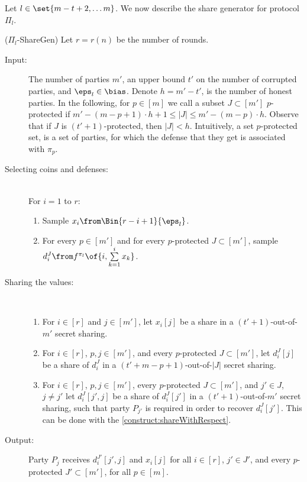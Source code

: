 Let $l\in\set{m-t+2,\ldots m}$. We now describe the share generator for protocol $\Pi_l$.
\begin{algorithm}($\Pi_l$-ShareGen)
Let $r=r(n)$ be the number of rounds.
\begin{description}
	\item[Input:] The number of parties $m'$, an upper bound $t'$ on the number of corrupted parties, and $\eps_l\in\bias$.
	Denote $h=m'-t'$, is the number of honest parties. In the following, for $p\in[m]$ we call a subset $J\subset[m']$ $p$-protected if $m'-(m-p+1)\cdot h+1\leq|J|\leq m'-(m-p)\cdot h$. Observe that if $J$ is $(t'+1)$-protected, then $|J|<h$. Intuitively, a set $p$-protected set, is a set of parties, for which the defense that they get is associated with $\pi_p$.
	\item[Selecting coins and defenses:]~\\
	For $i=1$ to $r$:
		\begin{enumerate}
			\item Sample $x_i\from\Bin{r-i+1}{\eps_l}$.
			\item For every $p\in[m']$ and for every $p$-protected $J\subset[m']$, sample $d^J_i\from f^{\pi_l}\of{i,\sum\limits_{k=1}^i x_k}$.
		\end{enumerate}
	\item[Sharing the values:]~
	\begin{enumerate}
		\item For $i\in[r]$ and $j\in[m']$, let $x_i[j]$ be a share in a $(t'+1)$-out-of-$m'$ secret sharing.
		\item For $i\in[r]$, $p,j\in[m']$, and every $p$-protected $J\subset[m']$, let $d_i^J[j]$ be a share of $d_i^J$ in a $(t'+m-p+1)$-out-of-$|J|$ secret sharing.
		\item For $i\in[r]$, $p,j\in[m']$, every $p$-protected $J\subset[m']$, and $j'\in J$, $j\ne j'$ let $d_i^J[j',j]$ be a share of $d_i^J[j']$ in a $(t'+1)$-out-of-$m'$ secret sharing, such that party $P_{j'}$ is required in order to recover $d_i^J[j']$. This can be done with the \cref{construct:shareWithRespect}.
	\end{enumerate}
	\item[Output:] Party $P_j$ receives $d_i^{J'}[j',j]$ and $x_i[j]$ for all $i\in[r]$, $j'\in J'$, and every $p$-protected $J'\subset[m']$, for all $p\in[m]$. 
\end{description}
\end{algorithm}

